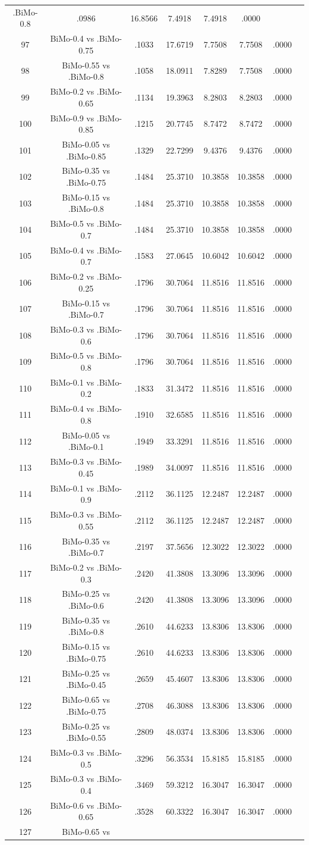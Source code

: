 \documentclass[a4paper,10pt]{article}
\begin{document}
\begin{landscape}
\begin{table}[!htp]
\begin{tabular}{cccccccc}
.BiMo-0.8&.0986&16.8566&7.4918&7.4918&.0000\\97&BiMo-0.4 vs .BiMo-0.75&.1033&17.6719&7.7508&7.7508&.0000\\98&BiMo-0.55 vs .BiMo-0.8&.1058&18.0911&7.8289&7.7508&.0000\\99&BiMo-0.2 vs .BiMo-0.65&.1134&19.3963&8.2803&8.2803&.0000\\100&BiMo-0.9 vs .BiMo-0.85&.1215&20.7745&8.7472&8.7472&.0000\\101&BiMo-0.05 vs .BiMo-0.85&.1329&22.7299&9.4376&9.4376&.0000\\102&BiMo-0.35 vs .BiMo-0.75&.1484&25.3710&10.3858&10.3858&.0000\\103&BiMo-0.15 vs .BiMo-0.8&.1484&25.3710&10.3858&10.3858&.0000\\104&BiMo-0.5 vs .BiMo-0.7&.1484&25.3710&10.3858&10.3858&.0000\\105&BiMo-0.4 vs .BiMo-0.7&.1583&27.0645&10.6042&10.6042&.0000\\106&BiMo-0.2 vs .BiMo-0.25&.1796&30.7064&11.8516&11.8516&.0000\\107&BiMo-0.15 vs .BiMo-0.7&.1796&30.7064&11.8516&11.8516&.0000\\108&BiMo-0.3 vs .BiMo-0.6&.1796&30.7064&11.8516&11.8516&.0000\\109&BiMo-0.5 vs .BiMo-0.8&.1796&30.7064&11.8516&11.8516&.0000\\110&BiMo-0.1 vs .BiMo-0.2&.1833&31.3472&11.8516&11.8516&.0000\\111&BiMo-0.4 vs .BiMo-0.8&.1910&32.6585&11.8516&11.8516&.0000\\112&BiMo-0.05 vs .BiMo-0.1&.1949&33.3291&11.8516&11.8516&.0000\\113&BiMo-0.3 vs .BiMo-0.45&.1989&34.0097&11.8516&11.8516&.0000\\114&BiMo-0.1 vs .BiMo-0.9&.2112&36.1125&12.2487&12.2487&.0000\\115&BiMo-0.3 vs .BiMo-0.55&.2112&36.1125&12.2487&12.2487&.0000\\116&BiMo-0.35 vs .BiMo-0.7&.2197&37.5656&12.3022&12.3022&.0000\\117&BiMo-0.2 vs .BiMo-0.3&.2420&41.3808&13.3096&13.3096&.0000\\118&BiMo-0.25 vs .BiMo-0.6&.2420&41.3808&13.3096&13.3096&.0000\\119&BiMo-0.35 vs .BiMo-0.8&.2610&44.6233&13.8306&13.8306&.0000\\120&BiMo-0.15 vs .BiMo-0.75&.2610&44.6233&13.8306&13.8306&.0000\\121&BiMo-0.25 vs .BiMo-0.45&.2659&45.4607&13.8306&13.8306&.0000\\122&BiMo-0.65 vs .BiMo-0.75&.2708&46.3088&13.8306&13.8306&.0000\\123&BiMo-0.25 vs .BiMo-0.55&.2809&48.0374&13.8306&13.8306&.0000\\124&BiMo-0.3 vs .BiMo-0.5&.3296&56.3534&15.8185&15.8185&.0000\\125&BiMo-0.3 vs .BiMo-0.4&.3469&59.3212&16.3047&16.3047&.0000\\126&BiMo-0.6 vs .BiMo-0.65&.3528&60.3322&16.3047&16.3047&.0000\\127&BiMo-0.65 vs 
\end{tabular}
\end{table}
\end{landscape}
\end{document}
